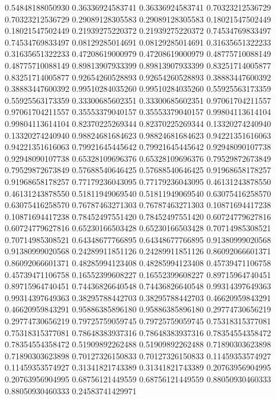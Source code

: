    0.54848188050930   0.36336924583741
   0.36336924583741   0.70323212536729
   0.70323212536729   0.29089128305583
   0.29089128305583   0.18021547502449
   0.18021547502449   0.21939275220372
   0.21939275220372   0.74534769833497
   0.74534769833497   0.08129285014691
   0.08129285014691   0.31635651322233
   0.31635651322233   0.47208619000979
   0.47208619000979   0.48775710088149
   0.48775710088149   0.89813907933399
   0.89813907933399   0.83251714005877
   0.83251714005877   0.92654260528893
   0.92654260528893   0.38883447600392
   0.38883447600392   0.99510284035260
   0.99510284035260   0.55925563173359
   0.55925563173359   0.33300685602351
   0.33300685602351   0.97061704211557
   0.97061704211557   0.35553379040157
   0.35553379040157   0.99804113614104
   0.99804113614104   0.82370225269344
   0.82370225269344   0.13320274240940
   0.13320274240940   0.98824681684623
   0.98824681684623   0.94221351616063
   0.94221351616063   0.79921645445642
   0.79921645445642   0.92948090107738
   0.92948090107738   0.65328109696376
   0.65328109696376   0.79529872673849
   0.79529872673849   0.57688540646425
   0.57688540646425   0.91968658178257
   0.91968658178257   0.77179236043095
   0.77179236043095   0.46131243878550
   0.46131243878550   0.51811949069540
   0.51811949069540   0.63075416258570
   0.63075416258570   0.76787463271303
   0.76787463271303   0.10871694417238
   0.10871694417238   0.78452497551420
   0.78452497551420   0.60724779627816
   0.60724779627816   0.65230166503428
   0.65230166503428   0.70714985308521
   0.70714985308521   0.64348677766895
   0.64348677766895   0.91380999020568
   0.91380999020568   0.24289911851126
   0.24289911851126   0.86092066601371
   0.86092066601371   0.48285994123408
   0.48285994123408   0.45739471106758
   0.45739471106758   0.16552399608227
   0.16552399608227   0.89715964740451
   0.89715964740451   0.74436826640548
   0.74436826640548   0.99314397649363
   0.99314397649363   0.38295788442703
   0.38295788442703   0.46620959843291
   0.46620959843291   0.95886385896180
   0.95886385896180   0.29774730656219
   0.29774730656219   0.79725759059745
   0.79725759059745   0.75318315377081
   0.75318315377081   0.78648383937316
   0.78648383937316   0.78354554358472
   0.78354554358472   0.51909892262488
   0.51909892262488   0.71890303623898
   0.71890303623898   0.70127326150833
   0.70127326150833   0.11459353574927
   0.11459353574927   0.31341821743389
   0.31341821743389   0.20763956904995
   0.20763956904995   0.68756121449559
   0.68756121449559   0.88050930460333
   0.88050930460333   0.24583741429971
